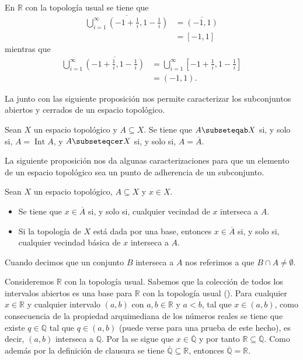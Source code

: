 \begin{Ejm}
   En $\mathbb{R}$ con la topología usual se tiene que
   $$
   \begin{aligned}
      \overline{\bigcup_{i=1}^{\infty}\left(-1+\frac{1}{i},1-\frac{1}{i}\right)} &= \overline{(-1,1)}\\
         &=[-1,1]
   \end{aligned}
   $$
   mientras que
   $$
   \begin{aligned}
      \bigcup_{i=1}^{\infty}\overline{\left( -1+\frac{1}{i},1-\frac{1}{i}\right)} &= \bigcup_{i=1}^{\infty}\left[-1+\frac{1}{i},1-\frac{1}{i}\right]\\
          &= (-1,1).
   \end{aligned}
   $$
\end{Ejm}
La  junto con las siguiente proposición nos permite caracterizar los subconjuntos abiertos y cerrados de un espacio topológico.
\begin{Prop}
   Sean $X$ un espacio topológico y $A\subseteq X$. Se tiene que $A\subseteqab X$ si, y solo si, $A=\operatorname{Int}A$, y $A\subseteqcer X$ si, y solo si, $A=\overline{A}$. 
\end{Prop}
La siguiente proposición nos da algunas caracterizaciones para que un elemento de un espacio topológico sea un punto de adherencia de un subconjunto.
\begin{Prop}\label{Prop:Caracterizacion_punto_adherencia}
   Sean $X$ un espacio topológico, $A\subseteq X$ y $x\in X$.
   \begin{itemize}
      \item[1.] Se tiene que $x\in \overline{A}$ si, y solo si, cualquier vecindad de $x$ interseca a $A$.
      \item[2.] Si la topología de $X$ está dada por una base, entonces $x\in\overline{A}$ si, y solo si, cualquier vecindad básica de $x$ interseca a $A$. 
   \end{itemize}
\end{Prop}
Cuando decimos que un conjunto $B$ interseca a $A$ nos referimos a que $B\cap A\neq \emptyset$.
\begin{Ejm}\label{Ejm:ejemplo_denso}
   Consideremos $\mathbb{R}$ con la topología usual. Sabemos que la colección de todos los intervalos abiertos es una base para $\mathbb{R}$ con la topología usual (). Para cualquier $x\in\mathbb{R}$ y cualquier intervalo $(a,b)$ con $a,b\in\mathbb{R}$ y $a<b$, tal que $x\in(a,b)$, como consecuencia de la propiedad arquimediana de los números reales se tiene que existe $q\in\mathbb{Q}$ tal que $q\in(a,b)$ (puede verse \cite{apostol1974} para una prueba de este hecho), es decir, $(a,b)$ interseca a $\mathbb{Q}$. Por la  se sigue que $x\in\overline{\mathbb{Q}}$ y por tanto $\mathbb{R}\subseteq\overline{\mathbb{Q}}$. Como además por la definición de clausura se tiene $\overline{\mathbb{Q}}\subseteq\mathbb{R}$, entonces $\overline{\mathbb{Q}}=\mathbb{R}$.
\end{Ejm}
